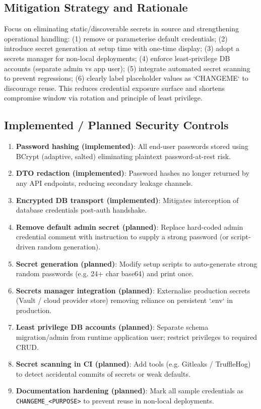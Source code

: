 \documentclass[]{UCD_CS_FYP_Report}
\begin{document}
\subsection*{Mitigation Strategy and Rationale}
Focus on eliminating static/discoverable secrets in source and strengthening operational handling: (1) remove or parameterise default credentials; (2) introduce secret generation at setup time with one-time display; (3) adopt a secrets manager for non-local deployments; (4) enforce least-privilege DB accounts (separate admin vs app user); (5) integrate automated secret scanning to prevent regressions; (6) clearly label placeholder values as `CHANGEME` to discourage reuse. This reduces credential exposure surface and shortens compromise window via rotation and principle of least privilege.

\subsection*{Implemented / Planned Security Controls}
\begin{enumerate}
	\item \textbf{Password hashing (implemented)}: All end-user passwords stored using BCrypt (adaptive, salted) eliminating plaintext password-at-rest risk.
	\item \textbf{DTO redaction (implemented)}: Password hashes no longer returned by any API endpoints, reducing secondary leakage channels.
	\item \textbf{Encrypted DB transport (implemented)}: Mitigates interception of database credentials post-auth handshake.
	\item \textbf{Remove default admin secret (planned)}: Replace hard-coded admin credential comment with instruction to supply a strong password (or script-driven random generation).
	\item \textbf{Secret generation (planned)}: Modify setup scripts to auto-generate strong random passwords (e.g. 24+ char base64) and print once.
	\item \textbf{Secrets manager integration (planned)}: Externalise production secrets (Vault / cloud provider store) removing reliance on persistent `.env` in production.
	\item \textbf{Least privilege DB accounts (planned)}: Separate schema migration/admin from runtime application user; restrict privileges to required CRUD.
	\item \textbf{Secret scanning in CI (planned)}: Add tools (e.g. Gitleaks / TruffleHog) to detect accidental commits of secrets or weak defaults.
		\item \textbf{Documentation hardening (planned)}: Mark all sample credentials as \texttt{CHANGEME\_<PURPOSE>} to prevent reuse in non-local deployments.
\end{enumerate}
\end{document}
